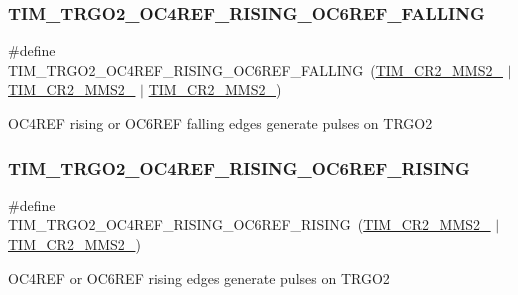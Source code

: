 \subsubsection{\texorpdfstring{TIM\_TRGO2\_OC4REF\_RISING\_OC6REF\_FALLING}{TIM\_TRGO2\_OC4REF\_RISING\_OC6REF\_FALLING}}
{\footnotesize\ttfamily \#define T\+I\+M\+\_\+\+T\+R\+G\+O2\+\_\+\+O\+C4\+R\+E\+F\+\_\+\+R\+I\+S\+I\+N\+G\+\_\+\+O\+C6\+R\+E\+F\+\_\+\+F\+A\+L\+L\+I\+NG~(\mbox{\hyperlink{group___peripheral___registers___bits___definition_ga3503937610adbf78153c1fcfa4bcd6ea}{T\+I\+M\+\_\+\+C\+R2\+\_\+\+M\+M\+S2\+\_}} $\vert$ \mbox{\hyperlink{group___peripheral___registers___bits___definition_gaa49670c71a446e5201994716b08b1527}{T\+I\+M\+\_\+\+C\+R2\+\_\+\+M\+M\+S2\+\_}} $\vert$ \mbox{\hyperlink{group___peripheral___registers___bits___definition_ga07efe60d8d7305b78085233ddaecb990}{T\+I\+M\+\_\+\+C\+R2\+\_\+\+M\+M\+S2\+\_}})}

O\+C4\+R\+EF rising or O\+C6\+R\+EF falling edges generate pulses on T\+R\+G\+O2 \mbox{\label{group___t_i_m___master___mode___selection__2_ga367b1addfd2f36bb8ed29e8e70e57024}} 
\subsubsection{\texorpdfstring{TIM\_TRGO2\_OC4REF\_RISING\_OC6REF\_RISING}{TIM\_TRGO2\_OC4REF\_RISING\_OC6REF\_RISING}}
{\footnotesize\ttfamily \#define T\+I\+M\+\_\+\+T\+R\+G\+O2\+\_\+\+O\+C4\+R\+E\+F\+\_\+\+R\+I\+S\+I\+N\+G\+\_\+\+O\+C6\+R\+E\+F\+\_\+\+R\+I\+S\+I\+NG~(\mbox{\hyperlink{group___peripheral___registers___bits___definition_ga3503937610adbf78153c1fcfa4bcd6ea}{T\+I\+M\+\_\+\+C\+R2\+\_\+\+M\+M\+S2\+\_}} $\vert$ \mbox{\hyperlink{group___peripheral___registers___bits___definition_gaa49670c71a446e5201994716b08b1527}{T\+I\+M\+\_\+\+C\+R2\+\_\+\+M\+M\+S2\+\_}})}

O\+C4\+R\+EF or O\+C6\+R\+EF rising edges generate pulses on T\+R\+G\+O2 \mbox{\label{group___t_i_m___master___mode___selection__2_ga0916f567135c5ee60031da2d146ad10b}} 
